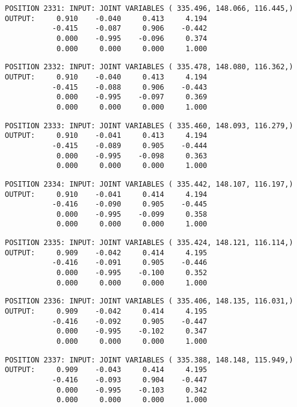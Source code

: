 \begin{verbatim}
POSITION 2331: INPUT: JOINT VARIABLES ( 335.496, 148.066, 116.445,)
OUTPUT:     0.910    -0.040     0.413     4.194
           -0.415    -0.087     0.906    -0.442
            0.000    -0.995    -0.096     0.374
            0.000     0.000     0.000     1.000
\end{verbatim} \pagebreak[1]\begin{verbatim}
POSITION 2332: INPUT: JOINT VARIABLES ( 335.478, 148.080, 116.362,)
OUTPUT:     0.910    -0.040     0.413     4.194
           -0.415    -0.088     0.906    -0.443
            0.000    -0.995    -0.097     0.369
            0.000     0.000     0.000     1.000
\end{verbatim} \pagebreak[1]\begin{verbatim}
POSITION 2333: INPUT: JOINT VARIABLES ( 335.460, 148.093, 116.279,)
OUTPUT:     0.910    -0.041     0.413     4.194
           -0.415    -0.089     0.905    -0.444
            0.000    -0.995    -0.098     0.363
            0.000     0.000     0.000     1.000
\end{verbatim} \pagebreak[1]\begin{verbatim}
POSITION 2334: INPUT: JOINT VARIABLES ( 335.442, 148.107, 116.197,)
OUTPUT:     0.910    -0.041     0.414     4.194
           -0.416    -0.090     0.905    -0.445
            0.000    -0.995    -0.099     0.358
            0.000     0.000     0.000     1.000
\end{verbatim} \pagebreak[1]\begin{verbatim}
POSITION 2335: INPUT: JOINT VARIABLES ( 335.424, 148.121, 116.114,)
OUTPUT:     0.909    -0.042     0.414     4.195
           -0.416    -0.091     0.905    -0.446
            0.000    -0.995    -0.100     0.352
            0.000     0.000     0.000     1.000
\end{verbatim} \pagebreak[1]\begin{verbatim}
POSITION 2336: INPUT: JOINT VARIABLES ( 335.406, 148.135, 116.031,)
OUTPUT:     0.909    -0.042     0.414     4.195
           -0.416    -0.092     0.905    -0.447
            0.000    -0.995    -0.102     0.347
            0.000     0.000     0.000     1.000
\end{verbatim} \pagebreak[1]\begin{verbatim}
POSITION 2337: INPUT: JOINT VARIABLES ( 335.388, 148.148, 115.949,)
OUTPUT:     0.909    -0.043     0.414     4.195
           -0.416    -0.093     0.904    -0.447
            0.000    -0.995    -0.103     0.342
            0.000     0.000     0.000     1.000
\end{verbatim} \pagebreak[1]\begin{verbatim}

\end{verbatim}
